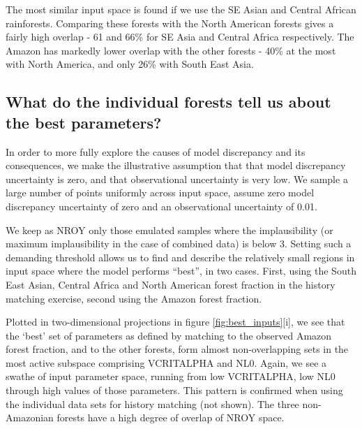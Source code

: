 \documentclass[esd, manuscript]{copernicus}
\begin{document}
The most similar input space is found if we use the SE Asian and Central African rainforests. Comparing these forests with the North American forests gives a fairly high overlap - 61 and 66\% for SE Asia and Central Africa respectively. The Amazon has markedly lower overlap with the other forests - 40\% at the most with North America, and only 26\% with South East Asia.

%

\subsection{What do the individual forests tell us about the best parameters?}\label{ssec:individual}
In order to more fully explore the causes of model discrepancy and its consequences, we make the illustrative assumption that that model discrepancy uncertainty is zero, and that observational uncertainty is very low. We sample a large number of points uniformly across input space, assume zero model discrepancy uncertainty of zero and an observational uncertainty of 0.01.

We keep as NROY only those emulated samples where the implausibility (or maximum implausibility in the case of combined data) is below 3. Setting such a demanding threshold allows us to find and describe the relatively small regions in input space where the model performs “best”, in two cases. First, using the South East Asian, Central Africa and North American forest fraction in the history matching exercise, second using the Amazon forest fraction.


Plotted in two-dimensional projections in figure \ref{fig:best_inputs}[i], we see that the `best' set of parameters as defined by matching to the observed Amazon forest fraction, and to the other forests, form almost non-overlapping sets in the most active subspace comprising VCRITALPHA and NL0. Again, we see a swathe of input parameter space, running from low VCRITALPHA, low NL0 through high values of those parameters. This pattern is confirmed when using the individual data sets for history matching (not shown). The three non-Amazonian forests have a high degree of overlap of NROY space.
\end{document}

